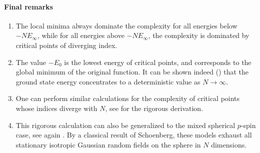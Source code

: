 \documentclass[amsmath,amssymb,nofootinbib,prd]{article}
\begin{document}
\paragraph{Final remarks}
\begin{enumerate}
\item The local minima always dominate the complexity for all energies below $-N E_\infty$, while for all energies above $-N E_\infty$, the complexity is dominated by critical points of diverging index.
\item The value $-E_0$ is the lowest energy of critical points, and corresponds to the global minimum of the original function.
It can be shown indeed (\cite{auffinger2013random}) that the ground state energy concentrates to a deterministic value as $N \to \infty$.
\item One can perform similar calculations for the complexity of critical points whose indices diverge with $N$, see \cite{auffinger2013complexity}  for the rigorous derivation.
\item This rigorous calculation can also be generalized to the mixed spherical $p$-spin case, see again \cite{auffinger2013complexity}. 
By a classical result of Schoenberg, these models exhaust all stationary isotropic Gaussian random fields on the sphere in $N$ dimensions.
\end{enumerate}



\end{document}

